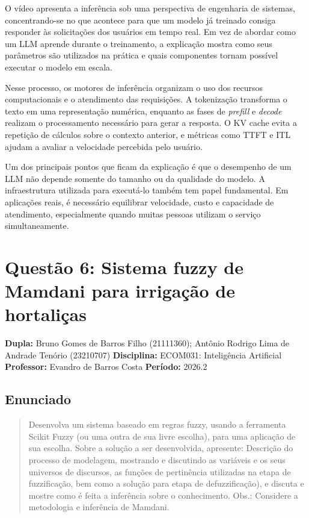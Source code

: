 \documentclass[12pt, a4paper]{article}
\begin{document}
O vídeo apresenta a inferência sob uma perspectiva de engenharia de sistemas, concentrando-se no que acontece para que um modelo já treinado consiga responder às solicitações dos usuários em tempo real. Em vez de abordar como um LLM aprende durante o treinamento, a explicação mostra como seus parâmetros são utilizados na prática e quais componentes tornam possível executar o modelo em escala.

Nesse processo, os motores de inferência organizam o uso dos recursos computacionais e o atendimento das requisições. A tokenização transforma o texto em uma representação numérica, enquanto as fases de \textit{prefill} e \textit{decode} realizam o processamento necessário para gerar a resposta. O KV cache evita a repetição de cálculos sobre o contexto anterior, e métricas como TTFT e ITL ajudam a avaliar a velocidade percebida pelo usuário.

Um dos principais pontos que ficam da explicação é que o desempenho de um LLM não depende somente do tamanho ou da qualidade do modelo. A infraestrutura utilizada para executá-lo também tem papel fundamental. Em aplicações reais, é necessário equilibrar velocidade, custo e capacidade de atendimento, especialmente quando muitas pessoas utilizam o serviço simultaneamente.

\section{Questão 6: Sistema fuzzy de Mamdani para irrigação de hortaliças}
\label{sec:q6}

\textbf{Dupla:} Bruno Gomes de Barros Filho (21111360); Antônio Rodrigo Lima de Andrade Tenório (23210707) \textbf{Disciplina:} ECOM031: Inteligência Artificial \textbf{Professor:} Evandro de Barros Costa \textbf{Período:} 2026.2

\subsection{Enunciado}\label{enunciado}

\begin{quote}
Desenvolva um sistema baseado em regras fuzzy, usando a ferramenta Scikit Fuzzy (ou uma outra de sua livre escolha), para uma aplicação de sua escolha. Sobre a solução a ser desenvolvida, apresente: Descrição do processo de modelagem, mostrando e discutindo as variáveis e os seus universos de discursos, as funções de pertinência utilizadas na etapa de fuzzificação, bem como a solução para etapa de defuzzificação), e discuta e mostre como é feita a inferência sobre o conhecimento. Obs.: Considere a metodologia e inferência de Mamdani.
\end{quote}
\end{document}
